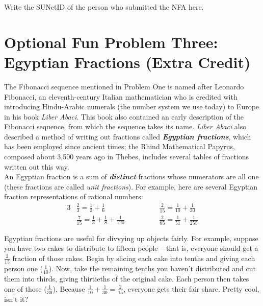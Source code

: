 \documentclass{article}
\renewcommand{\(}{\left(}
\renewcommand{\)}{\right)}
\theoremstyle{plain}
\theoremstyle{plain}
\theoremstyle{definition}
\renewcommand{\emph}[1]{\textit{\textbf{#1}}}
\begin{document}
\begin{shaded}
Write the SUNetID of the person who submitted the NFA here. 
\end{shaded}
































\section*{Optional Fun Problem Three: Egyptian Fractions (Extra Credit)}

The Fibonacci sequence mentioned in Problem One is named after Leonardo Fibonacci, an eleventh-century Italian mathematician who is credited with introducing Hindu-Arabic numerals (the number system we use today) to Europe in his book \textit{Liber Abaci}. This book also contained an early description of the Fibonacci sequence, from which the sequence takes its name. \textit{Liber Abaci} also described a method of writing out fractions called \emph{Egyptian fractions}, which has been employed since ancient times; the Rhind Mathematical Papyrus, composed about 3,500 years ago in Thebes, includes several tables of fractions written out this way. \\

An Egyptian fraction is a sum of \emph{distinct} fractions whose numerators are all one (these fractions are called \textit{unit fractions}). For example, here are several Egyptian fraction representations of rational numbers:
\begin{alignat*}{3}
& \frac{2}{3} = \frac{1}{2} + \frac{1}{6} \qquad\qquad\qquad && \frac{2}{15} = \frac{1}{10} + \frac{1}{30} \\
& \frac{7}{15} = \frac{1}{3} + \frac{1}{8} + \frac{1}{120} && \frac{2}{85} = \frac{1}{51} + \frac{1}{255}
\end{alignat*}

Egyptian fractions are useful for divvying up objects fairly. For example, suppose you have two cakes to distribute to fifteen people -- that is, everyone should get a $\frac{2}{15}$ fraction of those cakes. Begin by slicing each cake into tenths and giving each person one ($\frac{1}{10}$). Now, take the remaining tenths you haven't distributed and cut them into thirds, giving thirtieths of the original cake. Each person then takes one of those ($\frac{1}{30}$). Because $\frac{1}{10} + \frac{1}{30} = \frac{2}{15}$, everyone gets their fair share. Pretty cool, isn't it? \\
\end{document}
